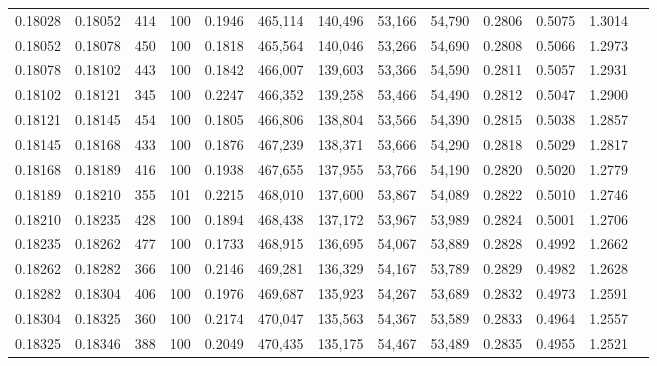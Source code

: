\begin{tabular}{rrrrrrrrrrrrr}
0.18028 & 0.18052 &   414 & 100 &                                     0.1946 & 465,114 & 140,496 &  53,166 &  54,790 & 0.2806 & 0.5075 & 1.3014 \\
0.18052 & 0.18078 &   450 & 100 &                                     0.1818 & 465,564 & 140,046 &  53,266 &  54,690 & 0.2808 & 0.5066 & 1.2973 \\
0.18078 & 0.18102 &   443 & 100 &                                     0.1842 & 466,007 & 139,603 &  53,366 &  54,590 & 0.2811 & 0.5057 & 1.2931 \\
0.18102 & 0.18121 &   345 & 100 &                                     0.2247 & 466,352 & 139,258 &  53,466 &  54,490 & 0.2812 & 0.5047 & 1.2900 \\
0.18121 & 0.18145 &   454 & 100 &                                     0.1805 & 466,806 & 138,804 &  53,566 &  54,390 & 0.2815 & 0.5038 & 1.2857 \\
0.18145 & 0.18168 &   433 & 100 &                                     0.1876 & 467,239 & 138,371 &  53,666 &  54,290 & 0.2818 & 0.5029 & 1.2817 \\
0.18168 & 0.18189 &   416 & 100 &                                     0.1938 & 467,655 & 137,955 &  53,766 &  54,190 & 0.2820 & 0.5020 & 1.2779 \\
0.18189 & 0.18210 &   355 & 101 &                                     0.2215 & 468,010 & 137,600 &  53,867 &  54,089 & 0.2822 & 0.5010 & 1.2746 \\
0.18210 & 0.18235 &   428 & 100 &                                     0.1894 & 468,438 & 137,172 &  53,967 &  53,989 & 0.2824 & 0.5001 & 1.2706 \\
0.18235 & 0.18262 &   477 & 100 &                                     0.1733 & 468,915 & 136,695 &  54,067 &  53,889 & 0.2828 & 0.4992 & 1.2662 \\
0.18262 & 0.18282 &   366 & 100 &                                     0.2146 & 469,281 & 136,329 &  54,167 &  53,789 & 0.2829 & 0.4982 & 1.2628 \\
0.18282 & 0.18304 &   406 & 100 &                                     0.1976 & 469,687 & 135,923 &  54,267 &  53,689 & 0.2832 & 0.4973 & 1.2591 \\
0.18304 & 0.18325 &   360 & 100 &                                     0.2174 & 470,047 & 135,563 &  54,367 &  53,589 & 0.2833 & 0.4964 & 1.2557 \\
0.18325 & 0.18346 &   388 & 100 &                                     0.2049 & 470,435 & 135,175 &  54,467 &  53,489 & 0.2835 & 0.4955 & 1.2521 \\

\end{tabular}
